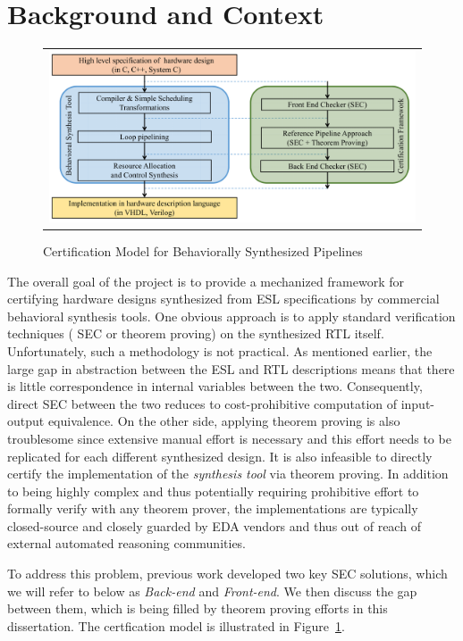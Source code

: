 \section{Background and Context}
\label{sec:background}

\begin{figure}[t!]
\begin{center}
\begin{tabular}{c}
\includegraphics[height=2in]{fig-proposal/certification-framework}
\end{tabular}
\end{center}
\caption{Certification Model for Behaviorally Synthesized Pipelines}
\label{fig:certification-framework}
\end{figure}

The overall goal of the project is to provide a mechanized framework
for certifying hardware designs synthesized from ESL specifications by
commercial behavioral synthesis tools.
One obvious approach is to apply standard verification techniques (%
SEC or
theorem proving) on the synthesized RTL itself.
Unfortunately, such a methodology is not practical.
As mentioned earlier, the large gap in abstraction
between the ESL and RTL descriptions means that there is little
correspondence in internal variables between the two.  Consequently,
direct SEC between the two reduces to cost-prohibitive computation of
input-output equivalence. On the other side, applying theorem proving
is also troublesome since extensive manual effort is necessary and
this effort needs to be replicated for each different synthesized
design. It is also infeasible to
directly certify the implementation of the {\em synthesis tool} via
theorem proving.  In addition to being highly complex and thus
potentially requiring prohibitive effort to formally verify with any
theorem prover, the implementations are typically closed-source and
closely guarded by EDA vendors and thus out of reach of external
automated reasoning communities.

To address this problem, previous work developed two key SEC
solutions, which we will refer to below as {\em Back-end} and {\em
Front-end}.  We then discuss the gap between them, which is being
filled by theorem proving efforts in this dissertation. The certfication model 
is illustrated in Figure~\ref{fig:certification-framework}.
\medskip


